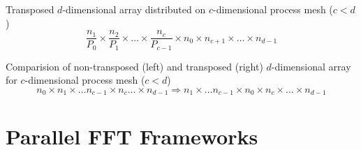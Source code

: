 Transposed $d$-dimensional array distributed on $c$-dimensional process mesh ($c<d$)
\begin{equation*}
  \frac{n_1}{P_0} \times \frac{n_2}{P_1} \times \hdots \times \frac{n_c}{P_{c-1}}  \times n_0 \times n_{c+1} \times \hdots \times n_{d-1}
\end{equation*}

Comparision of non-transposed (left) and transposed (right) $d$-dimensional array for $c$-dimensional process mesh ($c<d$)
\begin{equation*}
  n_0\times n_1\times \hdots n_{c-1} \times n_c \hdots \times n_{d-1} \Rightarrow n_1 \times \hdots n_{c-1} \times n_0 \times n_c \times \hdots \times n_{d-1}
\end{equation*}













\section{Parallel FFT Frameworks}

